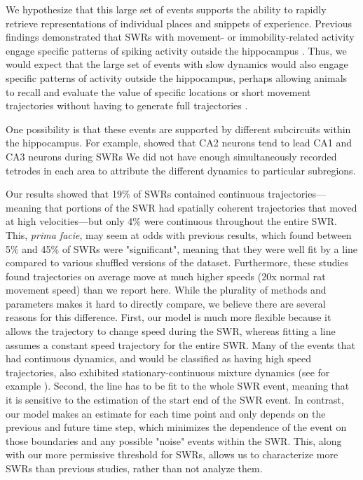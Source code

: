 \documentclass[9pt,lineno]{elife}
\begin{document}
We hypothesize that this large set of events supports the ability to rapidly retrieve representations of individual places and snippets of experience. Previous findings demonstrated that SWRs with movement- or immobility-related activity engage specific patterns of spiking activity outside the hippocampus \citep{YuDistincthippocampalcorticalmemory2017, JadhavCoordinatedExcitationInhibition2016}. Thus, we would expect that the large set of events with slow dynamics would also engage specific patterns of activity outside the hippocampus, perhaps allowing animals to recall and evaluate the value of specific locations or short movement trajectories without having to generate full trajectories \citep{YuHippocampalcorticalinteraction2015}. 

One possibility is that these events are supported by different subcircuits within the hippocampus. For example, \cite{OlivaRoleHippocampalCA22016} showed that CA2 neurons tend to lead CA1 and CA3 neurons during SWRs We did not have enough simultaneously recorded tetrodes in each area to attribute the different dynamics to particular subregions.

Our results showed that 19\% of SWRs contained continuous trajectories---meaning that portions of the SWR had spatially coherent trajectories that moved at high velocities---but only 4\% were continuous throughout the entire SWR. This, \textit{prima facie}, may seem at odds with previous results, which found between 5\% and 45\% of SWRs were "significant", meaning that they were well fit by a line compared to various shuffled versions of the dataset. Furthermore, these studies found trajectories on average move at much higher speeds (20x normal rat movement speed) than we report here. While the plurality of methods and parameters makes it hard to directly compare, we believe there are several reasons for this difference. First, our model is much more flexible because it allows the trajectory to change speed during the SWR, whereas fitting a line assumes a constant speed trajectory for the entire SWR. Many of the events that had continuous dynamics, and would be classified as having high speed trajectories, also exhibited stationary-continuous mixture dynamics (see for example ). Second, the line has to be fit to the whole SWR event, meaning that it is sensitive to the estimation of the start end of the SWR event. In contrast, our model makes an estimate for each time point and only depends on the previous and future time step, which minimizes the dependence of the event on those boundaries and any possible "noise" events within the SWR. This, along with our more permissive threshold for SWRs, allows us to characterize more SWRs than previous studies, rather than not analyze them.
 
\end{document}
